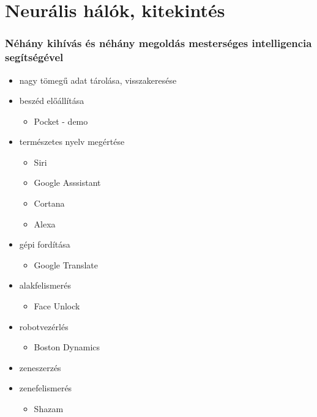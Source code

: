 \section{Neurális hálók, kitekintés}

\subsubsection{Néhány kihívás és néhány megoldás mesterséges intelligencia segítségével}

\begin{itemize}
    \item nagy tömegű adat tárolása, visszakeresése
    \item beszéd előállítása
        \begin{itemize}
            \item Pocket - demo
        \end{itemize}
    \item természetes nyelv megértése
        \begin{itemize}
            \item Siri
            \item Google Asssistant
            \item Cortana
            \item Alexa
        \end{itemize}
    \item gépi fordítása
        \begin{itemize}
            \item Google Translate
        \end{itemize}
    \item alakfelismerés
        \begin{itemize}
            \item Face Unlock
        \end{itemize}
    \item robotvezérlés
        \begin{itemize}
            \item Boston Dynamics
        \end{itemize}
    \item zeneszerzés
    \item zenefelismerés
        \begin{itemize}
            \item Shazam
        \end{itemize}
\end{itemize}

